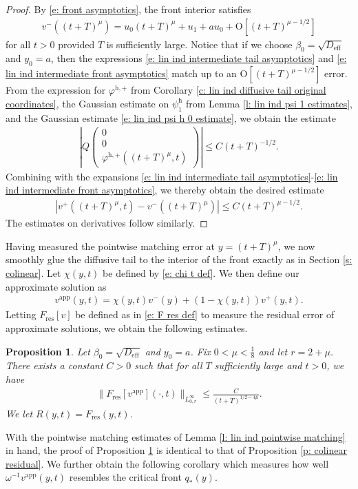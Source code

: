 \documentclass[11pt]{article}
\renewcommand{\phi}{\varphi}
\newtheorem{prop}{Proposition}
\numberwithin{equation}{section}
\numberwithin{prop}{section}
\newcommand{\psih}{\psi^\mathrm{h}}
\newcommand{\Deff}{D_\mathrm{eff}}
\newcommand{\phihp}{\phi^\mathrm{h, +}}
\begin{document}
\begin{proof}
	By \eqref{e: front asymptotics}, the front interior satisfies
	\begin{align}
	v^-((t+T)^\mu) = u_0 (t+T)^\mu + u_1 + a u_0 + \mathrm{O}[(t+T)^{\mu-1/2}] \label{e: lin ind intermediate front asymptotics}
	\end{align}
	for all $t > 0$ provided $T$ is sufficiently large. Notice that if we choose $\beta_0 = \sqrt{\Deff}$ and $y_0 = a$, then the expressions \eqref{e: lin ind intermediate tail asymptotics} and \eqref{e: lin ind intermediate front asymptotics} match up to an $\mathrm{O}[(t+T)^{\mu-1/2}]$ error. From the expression for $\phihp$ from Corollary \ref{c: lin ind diffusive tail original coordinates}, the Gaussian estimate on $\psih_1$ from Lemma \ref{l: lin ind psi 1 estimates}, and the Gaussian estimate \eqref{e: lin ind psi h 0 estimate}, we obtain the estimate
	\begin{align*}
	\left| Q \begin{pmatrix} 0 \\ 0 \\ \phihp((t+T)^\mu, t) \end{pmatrix} \right| \leq C (t+T)^{-1/2}. 
	\end{align*}
	Combining with the expansions \eqref{e: lin ind intermediate tail asymptotics}-\eqref{e: lin ind intermediate front asymptotics}, we thereby obtain the desired estimate
	\begin{align*}
	| v^+((t+T)^\mu, t) - v^-((t+T)^\mu) | \leq C (t+T)^{\mu-1/2}. 
	\end{align*}
	The estimates on derivatives follow similarly. 
\end{proof}

Having measured the pointwise matching error at $y = (t+T)^\mu$, we now smoothly glue the diffusive tail to the interior of the front exactly as in Section \ref{s: colinear}. Let $\chi(y,t)$ be defined by \eqref{e: chi t def}. We then define our approximate solution as 
\begin{align}
v^\mathrm{app} (y,t) = \chi(y,t) v^-(y) + (1-\chi(y,t)) v^+(y,t). 
\end{align}
Letting $F_\mathrm{res}[v]$ be defined as in \eqref{e: F res def} to measure the residual error of approximate solutions, we obtain the following estimates.
\begin{prop}\label{p: lin ind residual estimate}
	Let $\beta_0 = \sqrt{\Deff}$ and $y_0 = a$. Fix $0 < \mu < \frac{1}{8}$ and let $r = 2 + \mu$. There exists a constant $C > 0$ such that for all $T$ sufficiently large and $t > 0$, we have
	\begin{align}
	\| F_\mathrm{res}[v^\mathrm{app}](\cdot, t) \|_{L^\infty_{0, r}} \leq \frac{C}{(t+T)^{1/2-4\mu}}. 
	\end{align}
	We let $R(y,t) = F_\mathrm{res}(y,t)$. 
\end{prop}
With the pointwise matching estimates of Lemma \ref{l: lin ind pointwise matching} in hand, the proof of Proposition \ref{p: lin ind residual estimate} is identical to that of Proposition \ref{p: colinear residual}. We further obtain the following corollary which measures how well $\omega^{-1} v^\mathrm{app}(y,t)$ resembles the critical front $q_*(y)$. 
\end{document}
